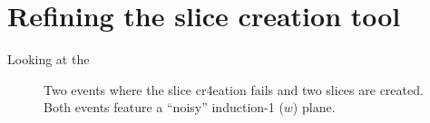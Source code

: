 \section{Refining the slice creation tool}

Looking at the 


\begin{figure}
    \centering
    
    \caption[Examples of issues with the slice creation]{Two events where the slice cr4eation fails and two slices are created. Both events feature a ``noisy'' induction-1 ($w$) plane. }
    \label{fig:sliceIssue}
\end{figure}
